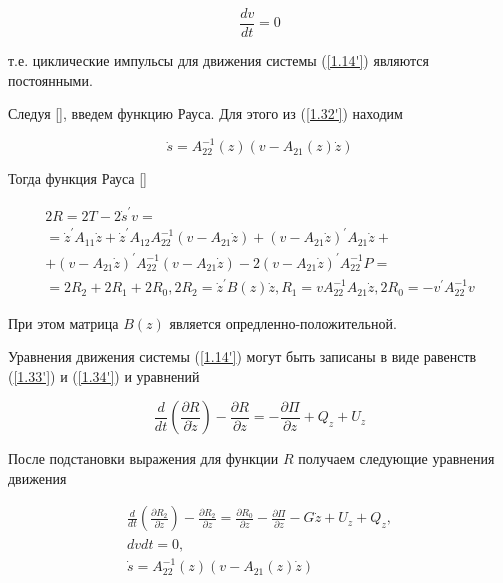 \begin{equation} \label{1.33'}
\frac{d v}{d t} = 0
\end{equation}

т.е. циклические импульсы для движения системы (\ref{1.14'}) являются постоянными.

Следуя [], введем функцию Рауса. Для этого из (\ref{1.32'}) находим

\begin{equation} \label{1.34'}
\dot s = A_{22}^{-1} (z) (v - A_{21} (z) \dot z)
\end{equation}

Тогда функция Рауса [] 

\begin{equation} \label{1.35'}
\begin{array}{c}
	2R = 2T - 2 \dot s^{'} v =\\
	= \dot z^{'} A_{11} \dot z + \dot z^{'} A_{12} A_{22}^{-1} (v - A_{21} \dot z) + (v - A_{21} \dot z)^{'} A_{21} \dot z +\\
	+ (v - A_21 \dot z)^{'} A_{22}^{-1} (v - A_{21} \dot z) - 2 (v - A_{21} \dot z)^{'} A_{22}^{-1} P =\\
	= 2 R_2 + 2 R_1 + 2 R_0, 2 R_2 = \dot z^{'} B (z) \dot z, R_1 = v A_{22}^{-1} A_{21} \dot z, 2 R_0 = - v^{'} A_{22}^{-1} v
\end{array}
\end{equation}

При этом матрица $B(z)$ является опредленно-положительной.

Уравнения движения системы (\ref{1.14'}) могут быть записаны в виде равенств (\ref{1.33'}) и (\ref{1.34'}) и уравнений

\begin{equation} \label{1.36'}
\frac{d}{dt} (\frac{\partial R}{\partial \dot z}) - \frac{\partial R}{\partial z} = - \frac{\partial \Pi}{\partial z} + Q_z + U_z
\end{equation}

После подстановки выражения для функции $R$ получаем следующие уравнения движения 

\begin{equation} \label{1.37'}
\begin{array}{c}
\displaystyle \frac{d}{dt} (\frac{\partial R_2}{\partial \dot z}) - \frac{\partial R_2}{\partial z} = \frac{\partial R_0}{\partial z} - \frac{\partial \Pi}{\partial z} - G \dot z + U_z + Q_z,\\
{d v}{d t} = 0,\\
\displaystyle \dot s = A_{22}^{-1} (z) (v - A_{21} (z) \dot z)
\end{array}
\end{equation}

